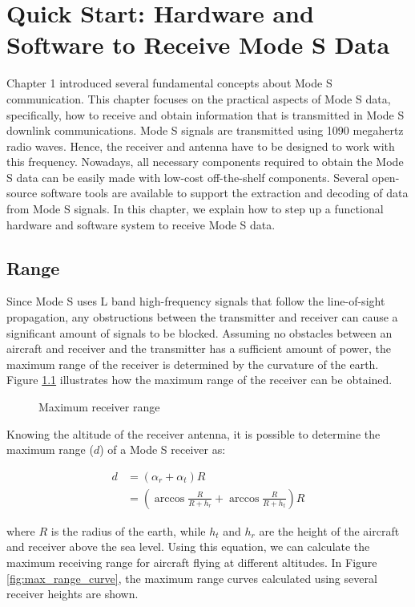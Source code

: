 \chapter{Quick Start: Hardware and Software to Receive Mode S Data}
\label{chap:quickstart}

Chapter 1 introduced several fundamental concepts about Mode S communication. This chapter focuses on the practical aspects of Mode S data, specifically, how to receive and obtain information that is transmitted in Mode S downlink communications. Mode S signals are transmitted using 1090 megahertz radio waves. Hence, the receiver and antenna have to be designed to work with this frequency. Nowadays, all necessary components required to obtain the Mode S data can be easily made with low-cost off-the-shelf components. Several open-source software tools are available to support the extraction and decoding of data from Mode S signals. In this chapter, we explain how to step up a functional hardware and software system to receive Mode S data.

\section{Range}
Since Mode S uses L band high-frequency signals that follow the line-of-sight propagation, any obstructions between the transmitter and receiver can cause a significant amount of signals to be blocked. Assuming no obstacles between an aircraft and receiver and the transmitter has a sufficient amount of power, the maximum range of the receiver is determined by the curvature of the earth. Figure \ref{fig:max_range} illustrates how the maximum range of the receiver can be obtained.

\begin{figure}[ht]
  \centering
  
  \caption{Maximum receiver range}
  \label{fig:max_range}
\end{figure}


Knowing the altitude of the receiver antenna, it is possible to determine the maximum range ($d$) of a Mode S receiver as:

\begin{align}
  d &= (\alpha_r + \alpha_t) R \\
  & = \left( \arccos \frac{R}{R+h_r} + \arccos \frac{R}{R+h_t} \right) R
\end{align}

\noindent where $R$ is the radius of the earth, while $h_t$ and $h_r$ are the height of the aircraft and receiver above the sea level. Using this equation, we can calculate the maximum receiving range for aircraft flying at different altitudes. In Figure \ref{fig:max_range_curve}, the maximum range curves calculated using several receiver heights are shown.

